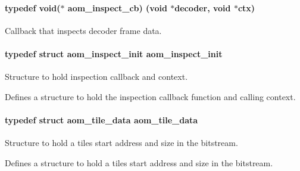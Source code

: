 \paragraph[{\texorpdfstring{aom\+\_\+inspect\+\_\+cb}{aom_inspect_cb}}]{\setlength{\rightskip}{0pt plus 5cm}typedef void($\ast$ aom\+\_\+inspect\+\_\+cb) (void $\ast$decoder, void $\ast$ctx)}\hypertarget{group__aom__decoder_ga1b37b4b76004e5a2776c2e2f16b052cd}{}\label{group__aom__decoder_ga1b37b4b76004e5a2776c2e2f16b052cd}
Callback that inspects decoder frame data. 
\paragraph[{\texorpdfstring{aom\+\_\+inspect\+\_\+init}{aom_inspect_init}}]{\setlength{\rightskip}{0pt plus 5cm}typedef struct {\bf aom\+\_\+inspect\+\_\+init}  {\bf aom\+\_\+inspect\+\_\+init}}\hypertarget{group__aom__decoder_gacb9e1c8988786bd40511f75106785f6d}{}\label{group__aom__decoder_gacb9e1c8988786bd40511f75106785f6d}


Structure to hold inspection callback and context. 

Defines a structure to hold the inspection callback function and calling context. 
\paragraph[{\texorpdfstring{aom\+\_\+tile\+\_\+data}{aom_tile_data}}]{\setlength{\rightskip}{0pt plus 5cm}typedef struct {\bf aom\+\_\+tile\+\_\+data}  {\bf aom\+\_\+tile\+\_\+data}}\hypertarget{group__aom__decoder_ga9a0f96778a43917403e5163338bc1554}{}\label{group__aom__decoder_ga9a0f96778a43917403e5163338bc1554}


Structure to hold a tile\textquotesingle{}s start address and size in the bitstream. 

Defines a structure to hold a tile\textquotesingle{}s start address and size in the bitstream. 
